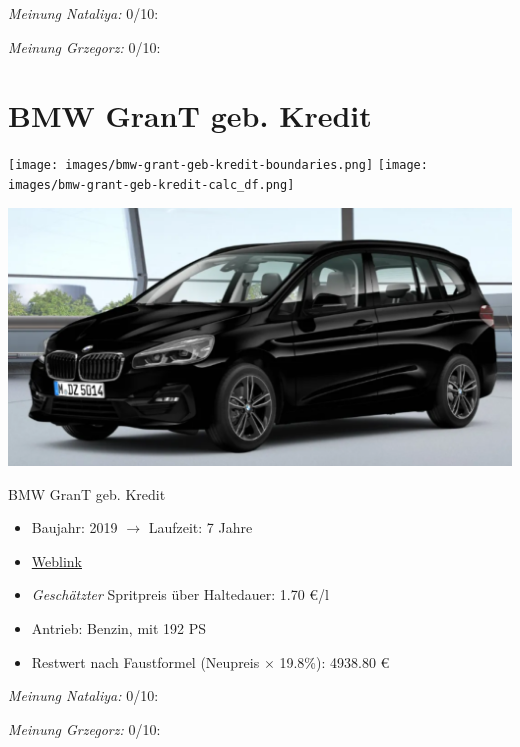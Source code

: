 \documentclass[landscape, DIV=99, 14pt]{scrartcl}
\begin{document}
\begin{small}
\emph{Meinung Nataliya:} 0/10: 
        
\emph{Meinung Grzegorz:} 0/10: 
\end{small}

\pagebreak


\twocolumn

\section*{BMW GranT geb. Kredit}
\begin{center}
\texttt{[image: images/bmw-grant-geb-kredit-boundaries.png]}
\null
\vspace{0.5cm}
\texttt{[image: images/bmw-grant-geb-kredit-calc\_df.png]}
\end{center}

\pagebreak
\begin{center}
\includegraphics[width=0.9\columnwidth]{cars/bmw-gran-tourer-mulfinger.png}

BMW GranT geb. Kredit
\end{center}

\begin{itemize}
    \item Baujahr: 2019 $\rightarrow$ Laufzeit: 7 Jahre
    \item \href{https://mulfinger.de/de/fahrzeugangebot/BMW/220i-GranTourer-Sport-DKG-HUD-LED-ParkAssNavi/page1/details-p5clkem9?manufacturer=5&model=2534&view=list}{Weblink}
    \item \emph{Gesch\"atzter} Spritpreis \"uber Haltedauer: 1.70 \euro{}/l
    \item Antrieb: Benzin, mit 192 PS
    \item Restwert nach Faustformel (Neupreis $\times$ 19.8\%): 4938.80 \euro{}
\end{itemize}

\begin{small}
\emph{Meinung Nataliya:} 0/10: 
        
\emph{Meinung Grzegorz:} 0/10: 
\end{small}
\end{document}
